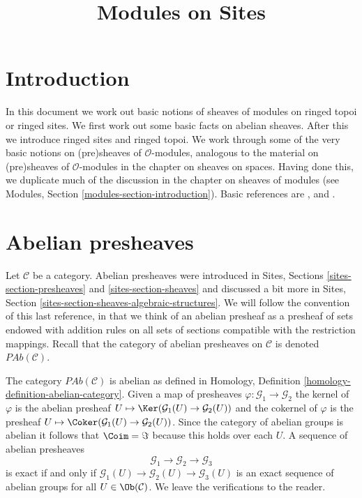 

%


\title{Modules on Sites}


\maketitle

\label{section-phantom}

\tableofcontents

\section{Introduction}
\label{section-introduction}

\noindent
In this document we work out basic notions of sheaves of modules on
ringed topoi or ringed sites. We first work out some basic facts on
abelian sheaves. After this we introduce ringed sites and ringed topoi.
We work through some of the very basic notions on (pre)sheaves of
$\mathcal{O}$-modules, analogous to the material on (pre)sheaves of
$\mathcal{O}$-modules in the chapter on sheaves on spaces.
Having done this, we duplicate much of the discussion in the chapter on
sheaves of modules (see Modules, Section \ref{modules-section-introduction}).
Basic references are \cite{FAC}, \cite{EGA} and \cite{SGA4}.






\section{Abelian presheaves}
\label{section-abelian-pre-sheaves}

\noindent
Let $\mathcal{C}$ be a category.
Abelian presheaves were introduced in
Sites, Sections \ref{sites-section-presheaves}
and \ref{sites-section-sheaves} and discussed a bit more
in Sites, Section \ref{sites-section-sheaves-algebraic-structures}.
We will follow the convention of this last reference, in that we think
of an abelian presheaf as a presheaf of sets endowed with addition rules
on all sets of sections compatible with the restriction mappings.
Recall that the category of abelian presheaves on $\mathcal{C}$
is denoted $\textit{PAb}(\mathcal{C})$.

\medskip\noindent
The category $\textit{PAb}(\mathcal{C})$ is abelian as defined in
Homology, Definition \ref{homology-definition-abelian-category}.
Given a map of presheaves $\varphi : \mathcal{G}_1 \to \mathcal{G}_2$
the kernel of $\varphi$ is the abelian presheaf
$U \mapsto \Ker(\mathcal{G}_1(U) \to \mathcal{G}_2(U))$ and
the cokernel of $\varphi$ is the presheaf
$U \mapsto \Coker(\mathcal{G}_1(U) \to \mathcal{G}_2(U))$.
Since the category of abelian groups is abelian it follows that
$\Coim = \Im$ because this holds over each $U$.
A sequence of abelian presheaves
$$
\mathcal{G}_1 \longrightarrow
\mathcal{G}_2 \longrightarrow
\mathcal{G}_3
$$
is exact if and only if
$\mathcal{G}_1(U) \to \mathcal{G}_2(U) \to \mathcal{G}_3(U)$
is an exact sequence of abelian groups for all $U \in \Ob(\mathcal{C})$.
We leave the verifications to the reader.

